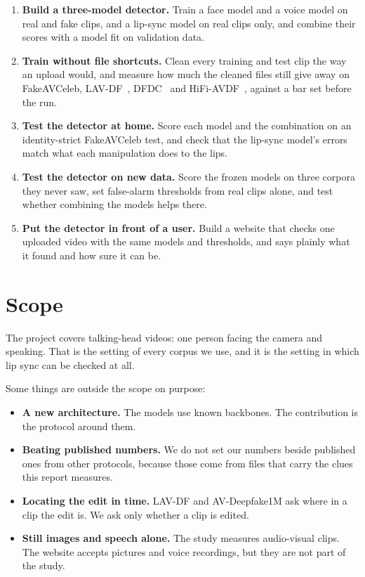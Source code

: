 \begin{enumerate}
    \item \textbf{Build a three-model detector.} Train a face model and a voice
    model on real and fake clips, and a lip-sync model on real clips only, and
    combine their scores with a model fit on validation data.
    \item \textbf{Train without file shortcuts.} Clean every training and test
    clip the way an upload would, and measure how much the cleaned files still
    give away on FakeAVCeleb, LAV-DF~\cite{lavdf}, DFDC~\cite{dfdc} and
    HiFi-AVDF~\cite{havic}, against a bar set before the run.
    \item \textbf{Test the detector at home.} Score each model and the
    combination on an identity-strict FakeAVCeleb test, and check that the
    lip-sync model's errors match what each manipulation does to the lips.
    \item \textbf{Test the detector on new data.} Score the frozen models on
    three corpora they never saw, set false-alarm thresholds from real clips
    alone, and test whether combining the models helps there.
    \item \textbf{Put the detector in front of a user.} Build a website that
    checks one uploaded video with the same models and thresholds, and says
    plainly what it found and how sure it can be.
\end{enumerate}

\section{Scope}

The project covers talking-head videos: one person facing the camera and
speaking. That is the setting of every corpus we use, and it is the setting in
which lip sync can be checked at all.

Some things are outside the scope on purpose:

\begin{itemize}
    \item \textbf{A new architecture.} The models use known backbones. The
    contribution is the protocol around them.
    \item \textbf{Beating published numbers.} We do not set our numbers beside
    published ones from other protocols, because those come from files that
    carry the clues this report measures.
    \item \textbf{Locating the edit in time.} LAV-DF and AV-Deepfake1M ask
    where in a clip the edit is. We ask only whether a clip is edited.
    \item \textbf{Still images and speech alone.} The study measures
    audio-visual clips. The website accepts pictures and voice recordings,
    but they are not part of the study.
\end{itemize}

